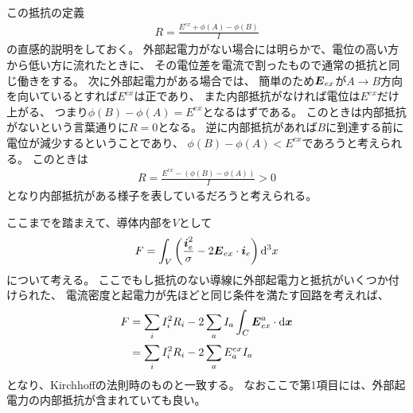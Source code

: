 \documentclass[a4paper, 12pt]{jsarticle}
\theoremstyle{definition}
\def\vec#1{\mbox{\boldmath $#1$}}
\newcommand{\ddif}{{\rm d}}
\begin{document}
この抵抗の定義
\begin{align}
	R = \frac{E^{ex} + \phi(A) - \phi(B)}{I}
\end{align}
の直感的説明をしておく。
外部起電力がない場合には明らかで、電位の高い方から低い方に流れたときに、
その電位差を電流で割ったもので通常の抵抗と同じ働きをする。
次に外部起電力がある場合では、
簡単のため$\vec{E}_{ex}$が$A \to B$方向を向いているとすれば$E^{ex}$は正であり、
また内部抵抗がなければ電位は$E^{ex}$だけ上がる、
つまり$\phi(B) - \phi(A) = E^{ex}$となるはずである。
このときは内部抵抗がないという言葉通りに$R = 0$となる。
逆に内部抵抗があれば$B$に到達する前に電位が減少するということであり、
$\phi(B) - \phi(A) < E^{ex}$であろうと考えられる。
このときは
\begin{align}
	R = \frac{E^{ex} - ( \phi(B) - \phi(A) )}{I} > 0
\end{align}
となり内部抵抗がある様子を表しているだろうと考えられる。

ここまでを踏まえて、導体内部を$V$として
\begin{align}
	F = \int_V \left( \frac{\vec{i}_e^2}{\sigma}
	- 2 \vec{E}_{ex} \cdot \vec{i}_e \right) \ddif^3 x
\end{align}
について考える。
ここでもし抵抗のない導線に外部起電力と抵抗がいくつか付けられた、
電流密度と起電力が先ほどと同じ条件を満たす回路を考えれば、
\begin{align}
	F &= \sum_i I_i^2 R_i
	- 2 \sum_a I_a \int_C \vec{E}^a_{ex} \cdot \ddif \vec{x} \\
	&= \sum_i I_i^2 R_i - 2 \sum_a E_a^{ex} I_a
\end{align}
となり、Kirchhoffの法則時のものと一致する。
なおここで第1項目には、外部起電力の内部抵抗が含まれていても良い。
\end{document}
